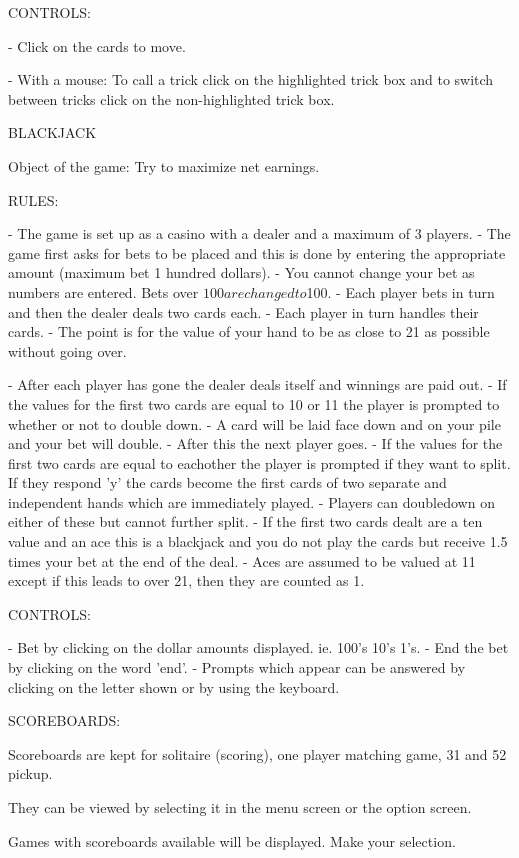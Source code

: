 CONTROLS:

- Click on the cards to move.

- With a mouse:
     To call a trick click on the highlighted trick box and to       
     switch between tricks click on the non-highlighted trick box.


BLACKJACK

Object of the game: Try to maximize net earnings.

RULES:

- The game is set up as a casino with a dealer and a maximum of 3
players.
- The game first asks for bets to be placed and this is done by
entering the appropriate amount (maximum bet 1 hundred dollars).
- You cannot change your bet as numbers are entered. Bets over $100
are changed to $100.
- Each player bets in turn and then the dealer deals two cards each.
- Each player in turn handles their cards.
- The point is for the value of your hand to be as close to 21 as
possible without going over.

- After each player has gone the dealer deals itself and winnings are
paid out.
- If the values for the first two cards are equal to 10 or 11 the
player is prompted to whether or not to double down.
- A card will be laid face down and on your pile and your bet will
double.
- After this the next player goes.
- If the values for the first two cards are equal to eachother the
player is prompted if they want to split.  If they respond 'y' the
cards become the first cards of two separate and independent hands
which are immediately played.
- Players can doubledown on either of these but cannot further split.
- If the first two cards dealt are a ten value and an ace this is a
blackjack and you do not play the cards but receive 1.5 times your
bet at the end of the deal.
- Aces are assumed to be valued at 11 except if this leads to over
21, then they are counted as 1.

CONTROLS:

- Bet by clicking on the dollar amounts displayed.
     ie. 100's 10's 1's.
- End the bet by clicking on the word 'end'.
- Prompts which appear can be answered by clicking on the letter
shown or by using the keyboard.


SCOREBOARDS:

Scoreboards are kept for solitaire (scoring), one player matching
game, 31 and 52 pickup.

They can be viewed by selecting it in the menu screen or the option
screen.

Games with scoreboards available will be displayed.  Make your
selection.

